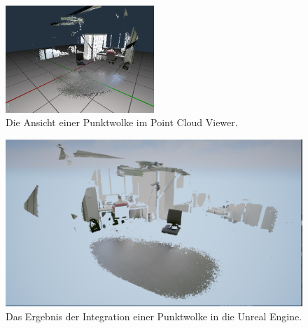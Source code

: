 \documentclass[a4paper]{IEEEtran}
\begin{document}
	\begin{figure}[!h]
    	\centering
		\includegraphics[width=0.5\textwidth]{img/CloudPCViewer}
	    \caption{Die Ansicht einer Punktwolke im Point Cloud Viewer.}
    	\label{CloudPCViewer}
	\end{figure}
	
		\begin{figure}[!h]
    	\centering
		\includegraphics[width=\textwidth]{img/Cloud}
	    \caption{Das Ergebnis der Integration einer Punktwolke in die Unreal Engine.}
    	\label{Cloud}
	\end{figure} 
\end{document}
